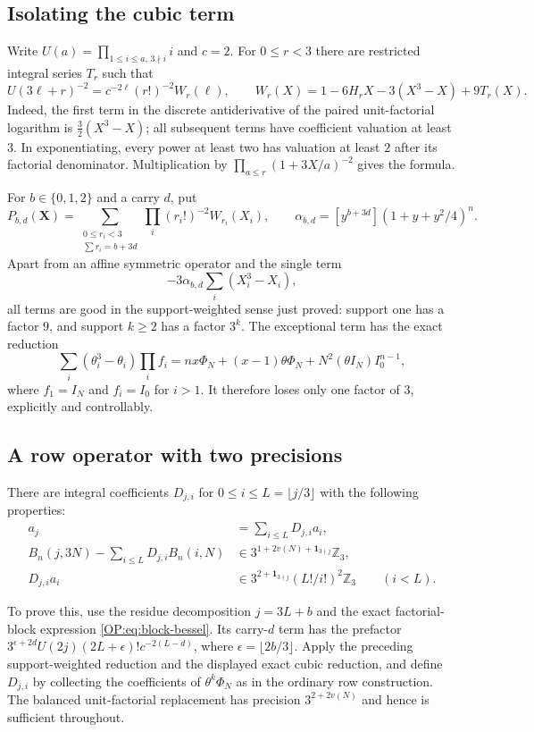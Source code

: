 \documentclass[11pt,a4paper]{article}
\theoremstyle{definition}\newtheorem{definition}[theorem]{Definition}
\theoremstyle{remark}\newtheorem{remark}[theorem]{Remark}
\numberwithin{equation}{section}
\begin{document}
\subsection{Isolating the cubic term}
Write $U(a)=\prod_{1\le i\le a,\,3\nmid i}i$ and $c=2$.
For $0\le r<3$ there are restricted integral series $T_r$ such that
\[
 U(3\ell+r)^{-2}
 =c^{-2\ell}(r!)^{-2}W_r(\ell),\qquad
 W_r(X)=1-6H_rX-3(X^3-X)+9T_r(X).
\]
Indeed, the first term in the discrete antiderivative of the paired
unit-factorial logarithm is $\frac32(X^3-X)$; all subsequent terms
have coefficient valuation at least $3$. In exponentiating, every
power at least two has valuation at least $2$ after its factorial
denominator. Multiplication by
$\prod_{a\le r}(1+3X/a)^{-2}$ gives the formula.

For $b\in\{0,1,2\}$ and a carry $d$, put
\[
 P_{b,d}(\mathbf X)=
 \sum_{\substack{0\le r_i<3\\\sum r_i=b+3d}}
 \prod_i(r_i!)^{-2}W_{r_i}(X_i),
 \qquad
 \alpha_{b,d}=[y^{b+3d}](1+y+y^2/4)^n.
\]
Apart from an affine symmetric operator and the single term
\[
 -3\alpha_{b,d}\sum_i(X_i^3-X_i),
\]
all terms are good in the support-weighted sense just proved:
support one has a factor $9$, and support $k\ge2$ has a factor $3^k$.
The exceptional term has the exact reduction
\[
 \sum_i(\theta_i^3-\theta_i)\prod_i f_i
 = nx\Phi_N+(x-1)\theta\Phi_N
    +N^2(\theta I_N)I_0^{n-1},
\]
where $f_1=I_N$ and $f_i=I_0$ for $i>1$.
It therefore loses only one factor of $3$, explicitly and controllably.

\subsection{A row operator with two precisions}
There are integral coefficients $D_{j,i}$ for $0\le i\le L=\lfloor j/3\rfloor$
with the following properties:
\begin{align*}
 a_j&=\sum_{i\le L}D_{j,i}a_i,\\
 B_n(j,3N)-\sum_{i\le L}D_{j,i}B_n(i,N)
   &\in3^{1+2v(N)+\mathbf1_{3\nmid j}}\mathbb Z_3,\\
 D_{j,i}a_i&\in
 3^{2+\mathbf1_{3\nmid j}}(L!/i!)^2\mathbb Z_3
 \qquad(i<L).
\end{align*}

To prove this, use the residue decomposition $j=3L+b$ and the exact
factorial-block expression \eqref{OP:eq:block-bessel}. Its carry-$d$
term has the prefactor
$3^{\epsilon+2d}U(2j)(2L+\epsilon)!c^{-2(L-d)}$,
where $\epsilon=\lfloor2b/3\rfloor$.
Apply the preceding support-weighted reduction and the displayed exact
cubic reduction, and define $D_{j,i}$ by collecting the coefficients
of $\theta^k\Phi_N$ as in the ordinary row construction.
The balanced unit-factorial replacement has precision
$3^{2+2v(N)}$ and hence is sufficient throughout.
\end{document}

